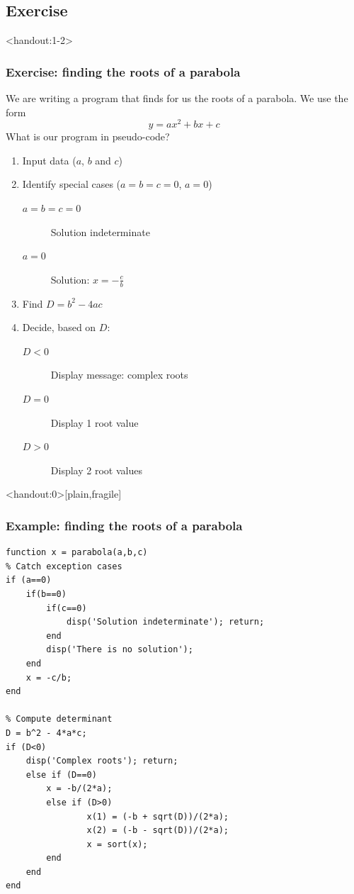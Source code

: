 \subsection*{Exercise}
\begin{frame}<handout:1-2>
  \frametitle{Exercise: finding the roots of a parabola}
  We are writing a program that finds for us the roots of a parabola. We use the form
  \[
    y = ax^2 + bx + c
  \]
  \pause
  What is our program in pseudo-code? \pause
  \begin{enumerate}[<+->]
    \item Input data ($a$, $b$ and $c$)
    \item Identify special cases ($a=b=c=0$, $a=0$)
    \begin{description}
      \item[$a=b=c=0$] Solution indeterminate
      \item[$a=0$] Solution: $x = -\frac{c}{b}$
    \end{description}
    \item Find $D = b^2-4ac$
    \item Decide, based on $D$:
    \begin{description}
      \item[$D<0$] Display message: complex roots
      \item[$D=0$] Display 1 root value
      \item[$D>0$] Display 2 root values
    \end{description}
  \end{enumerate}
\end{frame}

\begin{frame}<handout:0>[plain,fragile]
  \frametitle{Example: finding the roots of a parabola}
  \small\selectfont
  \begin{lstlisting}[basicstyle=\scriptsize\ttfamily]
function x = parabola(a,b,c)
% Catch exception cases
if (a==0)
    if(b==0)
        if(c==0)
            disp('Solution indeterminate'); return;
        end
        disp('There is no solution');
    end
    x = -c/b;
end

% Compute determinant
D = b^2 - 4*a*c;
if (D<0)
    disp('Complex roots'); return;
    else if (D==0)
        x = -b/(2*a);
        else if (D>0)
                x(1) = (-b + sqrt(D))/(2*a);
                x(2) = (-b - sqrt(D))/(2*a);
                x = sort(x);
        end
    end
end
  \end{lstlisting}
\end{frame}

